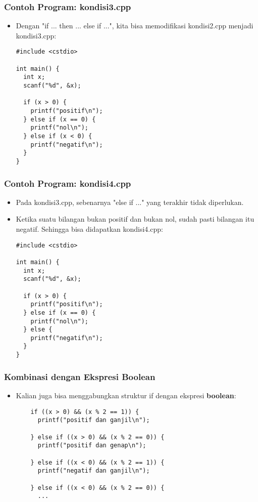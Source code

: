 \begin{frame}[fragile]
\frametitle{Contoh Program: kondisi3.cpp}
\begin{itemize}
  \item Dengan "if ... then ... else if ...", kita bisa memodifikasi kondisi2.cpp menjadi kondisi3.cpp:
\begin{lstlisting}
#include <cstdio>

int main() {
  int x;
  scanf("%d", &x);

  if (x > 0) {
    printf("positif\n");
  } else if (x == 0) {
    printf("nol\n");
  } else if (x < 0) {
    printf("negatif\n");
  }
}
\end{lstlisting}
\end{itemize}
\end{frame}

\begin{frame}[fragile]
\frametitle{Contoh Program: kondisi4.cpp}
\begin{itemize}
  \item Pada kondisi3.cpp, sebenarnya "else if ..." yang terakhir tidak diperlukan.
  \item Ketika suatu bilangan bukan positif dan bukan nol, sudah pasti bilangan itu negatif. Sehingga bisa didapatkan kondisi4.cpp:
\begin{lstlisting}
#include <cstdio>

int main() {
  int x;
  scanf("%d", &x);

  if (x > 0) {
    printf("positif\n");
  } else if (x == 0) {
    printf("nol\n");
  } else {
    printf("negatif\n");
  }
}
\end{lstlisting}
\end{itemize}
\end{frame}

\begin{frame}[fragile]
\frametitle{Kombinasi dengan Ekspresi Boolean}
\begin{itemize}
  \item Kalian juga bisa menggabungkan struktur if dengan ekspresi \textbf{boolean}:
  \begin{lstlisting}
    if ((x > 0) && (x % 2 == 1)) {
      printf("positif dan ganjil\n");

    } else if ((x > 0) && (x % 2 == 0)) {
      printf("positif dan genap\n");

    } else if ((x < 0) && (x % 2 == 1)) {
      printf("negatif dan ganjil\n");

    } else if ((x < 0) && (x % 2 == 0)) {
      ...
  \end{lstlisting}
\end{itemize}
\end{frame}

